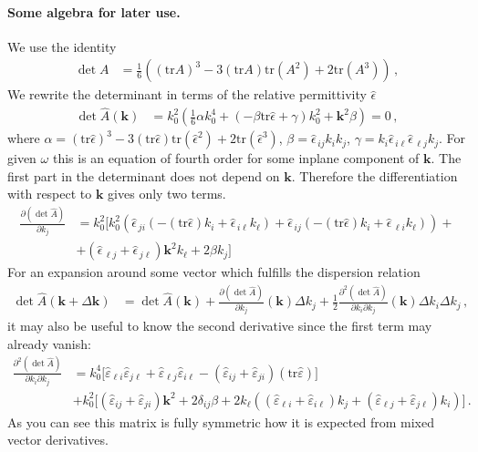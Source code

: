 \documentclass[12pt,a4paper,twoside,openright,BCOR10mm,headsepline,titlepage,abstracton,chapterprefix,final]{scrreprt}
\newcommand\Vector[1]{{\mathbf{#1}}}
\newcommand\wavenumber{k}
\newcommand\Wavevector{\Vector{\wavenumber}}
\newcommand\Tensor[1]{\hat{#1}}
\newcommand\permittivity{\Tensor{\scalarpermittivity}}
\newcommand\scalarrelativepermittivity{\epsilon}
\newcommand\relativepermittivity{\Tensor{\scalarrelativepermittivity}}
\newcommand\scalarpermittivity{\varepsilon}
\begin{document}
\paragraph{Some algebra for later use.}
We use the identity
\begin{align}
 \det A &= \frac{1}{6} ((\text{tr} A)^3 - 3 (\text{tr} A) \text{tr}(A^2) + 2 \text{tr}(A^3))\,,
\end{align}
We rewrite the determinant in terms of the relative permittivity $\relativepermittivity$
\begin{align}
 \det \hat{A}(\Vector{k}) 
 &= k_0^2 \left(\frac{1}{6} \alpha k_0^4 +  (-\beta \text{tr}\relativepermittivity + \gamma) k_0^2 + \Vector{k}^2 \beta \right)=0\,,\label{eq:determinantinvariant}
\end{align}
where $\alpha = (\text{tr}\relativepermittivity)^3 - 3 (\text{tr}\relativepermittivity) \text{tr}(\relativepermittivity^2) + 2 \text{tr}(\relativepermittivity^3)$,
$\beta = \relativepermittivity_{\,ij} k_i k_j$, 
$\gamma = k_i \relativepermittivity_{\,i\ell} \relativepermittivity_{\,\ell j} k_j$. 
For given $\omega$ this is an equation of fourth order
for some inplane component of $\Vector{k}$. The first part in the determinant does not depend on $\Vector{k}$. Therefore the differentiation with respect to
$\Vector{k}$ gives only two terms.
\begin{align}
 \frac{\partial (\det \hat{A})}{\partial k_j} &= k_0^2 
\big[
k_0^2
\left(
  \relativepermittivity_{\,ji} (-(\text{tr}\relativepermittivity) k_i + \relativepermittivity_{\,i\ell} k_\ell)
+ \relativepermittivity_{\,ij} (-(\text{tr}\relativepermittivity) k_i + \relativepermittivity_{\,\ell i} k_\ell)
\right) +
\nonumber \\
&+ (\relativepermittivity_{\,\ell j} + \relativepermittivity_{\,j \ell}) \Vector{k}^2 k_\ell + 2 \beta k_j
\big]
\end{align}
For an expansion around some vector which fulfills the dispersion relation
\begin{align}
  \det \hat{A}(\Vector{k} + \Delta \Vector{k}) 
  &= 
  \det \hat{A}(\Vector{k}) 
  + \frac{\partial (\det \hat{A})}{\partial k_j}(\Vector{k}) \Delta k_j 
  + \frac{1}{2} \frac{\partial^2 (\det \hat{A})}{\partial k_i \partial k_j}(\Vector{k}) \Delta k_i \Delta k_j\,,
\end{align}
it may also be useful to know the second derivative since the first term may already vanish:
\begin{align}
 \frac{\partial^2 (\det \hat{A})}{\partial k_i \partial k_j} &= 
k_0^4 \biggl[
  \permittivity_{\ell i} \permittivity_{j \ell} 
+ \permittivity_{\ell j} \permittivity_{i \ell}
- (\permittivity_{ij} + \permittivity_{ji}) (\text{tr}\permittivity)
\biggr] \nonumber\\ 
&+ k_0^2 \biggl[
  (\permittivity_{ij} + \permittivity_{ji})\Wavevector^2
+ 2 \delta_{ij} \beta
+ 2 k_\ell ((\permittivity_{\ell i}  + \permittivity_{i \ell}) k_j + (\permittivity_{\ell j} + \permittivity_{j \ell}) k_i)
\biggr]\,.
\end{align}
As you can see this matrix is fully symmetric how it is expected from mixed vector derivatives.
\end{document}
